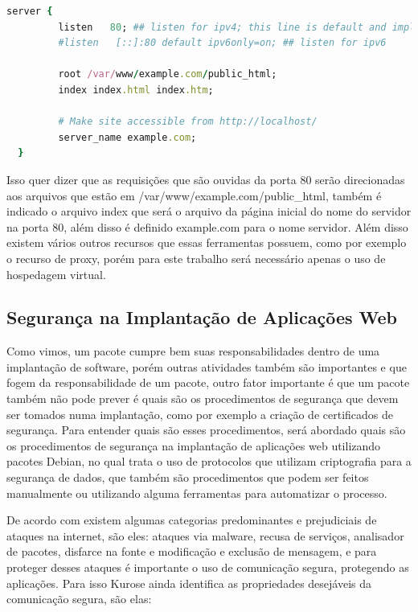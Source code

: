 \begin{lstlisting}[language=Ruby,label=dice_index,caption={Exemplo de arquivo de configuração de hospedagem virtual no Nginx}]
  server {
         listen   80; ## listen for ipv4; this line is default and implied
         #listen   [::]:80 default ipv6only=on; ## listen for ipv6

         root /var/www/example.com/public_html;
         index index.html index.htm;

         # Make site accessible from http://localhost/
         server_name example.com;
  }
\end{lstlisting}

Isso quer dizer que as requisições que são ouvidas da porta 80 serão direcionadas
aos arquivos que estão em /var/www/example.com/public\_html, também é indicado o
arquivo index que será o arquivo da página inicial do nome do servidor na porta 80,
além disso é definido example.com para o nome servidor. Além disso existem vários
outros recursos que essas ferramentas possuem, como por exemplo o recurso de proxy,
porém para este trabalho será necessário apenas o uso de hospedagem virtual.

\subsection{Segurança na Implantação de Aplicações Web}
\label{sec:seguranca}

Como vimos, um pacote cumpre bem suas responsabilidades dentro de uma implantação de
software, porém outras atividades também são importantes e que fogem da responsabilidade
de um pacote, outro fator importante é que um pacote também não pode prever é quais são
os procedimentos de segurança que devem ser tomados numa implantação, como por exemplo a criação de certificados de
segurança. Para entender quais são esses procedimentos, será abordado quais são
os procedimentos de segurança na implantação de aplicações web utilizando
pacotes Debian, no qual trata o uso de protocolos que utilizam criptografia para a segurança de dados,
que também são procedimentos que podem ser feitos manualmente ou utilizando alguma
ferramentas para automatizar o processo.

De acordo com \cite{kurose2010redes} existem algumas categorias predominantes e prejudiciais
de ataques na internet, são eles: ataques via malware, recusa de serviços, analisador
de pacotes, disfarce na fonte e modificação e exclusão de mensagem, e para proteger
desses ataques é importante o uso de comunicação segura, protegendo as aplicações. Para
isso Kurose ainda identifica as propriedades desejáveis da comunicação segura, são elas:

